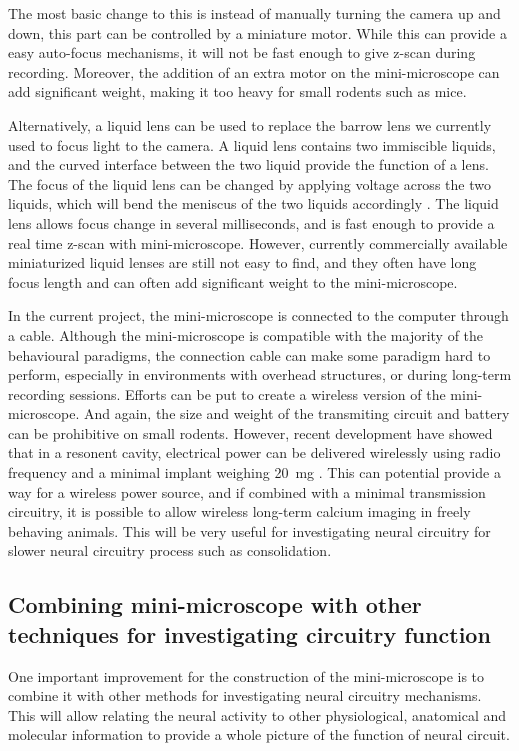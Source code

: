 The most basic change to this is instead of manually turning the camera up and down, this part can be controlled by a miniature motor. While this can provide a easy auto-focus mechanisms, it will not be fast enough to give z-scan during recording. Moreover, the addition of an extra motor on the mini-microscope can add significant weight, making it too heavy for small rodents such as mice. 

Alternatively, a liquid lens can be used to replace the barrow lens we currently used to focus light to the camera. A liquid lens contains two immiscible liquids, and the curved interface between the two liquid provide the function of a lens. The focus of the liquid lens can be changed by applying voltage across the two liquids, which will bend the meniscus of the two liquids accordingly \citep{kuiper04}. The liquid lens allows focus change in several milliseconds, and is fast enough to provide a real time z-scan with mini-microscope. However, currently commercially available miniaturized liquid lenses are still not easy to find, and they often have long focus length and can often add significant weight to the mini-microscope. 

In the current project, the mini-microscope is connected to the computer through a cable. Although the mini-microscope is compatible with the majority of the behavioural paradigms, the connection cable can make some paradigm hard to perform, especially in environments with overhead structures, or during long-term recording sessions. Efforts can be put to create a wireless version of the mini-microscope. And again, the size and weight of the transmiting circuit and battery can be prohibitive on small rodents. However, recent development have showed that in a resonent cavity, electrical power can be delivered wirelessly using radio frequency and a minimal implant weighing \SI{20}{\mg} \citep{montgomery15}. This can potential provide a way for a wireless power source, and if combined with a minimal transmission circuitry, it is possible to allow wireless long-term calcium imaging in freely behaving animals. This will be very useful for investigating neural circuitry for slower neural circuitry process such as consolidation. 

\subsection{Combining mini-microscope with other techniques for investigating circuitry function}

One important improvement for the construction of the mini-microscope is to combine it with other methods for investigating neural circuitry mechanisms. This will allow relating the neural activity to other physiological, anatomical and molecular information to provide a whole picture of the function of neural circuit. 

